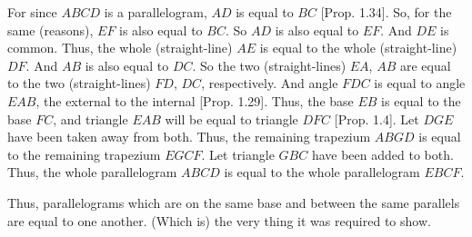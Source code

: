 \begin{Parallel}{}{}
{For since $ABCD$ is a parallelogram, $AD$ is equal to $BC$ [Prop. 1.34].
So, for the same (reasons), $EF$ is also equal to $BC$. So $AD$ is also equal to
$EF$. And $DE$ is common. Thus, the whole (straight-line) $AE$ is equal
to the whole (straight-line) $DF$.  And $AB$ is also equal to $DC$.
So the two (straight-lines) $EA$, $AB$
are equal to the two (straight-lines) $FD$, $DC$, respectively. And angle $FDC$ is
equal to angle $EAB$, the external to the internal [Prop. 1.29]. Thus, the
base $EB$ is equal to the base $FC$, and triangle $EAB$ will be equal to triangle
$DFC$ [Prop. 1.4]. Let $DGE$ have been taken away from both. 
Thus, the remaining trapezium $ABGD$ is equal to the remaining trapezium
$EGCF$. Let triangle $GBC$ have been added to both. Thus, the whole
parallelogram $ABCD$ is equal to the whole parallelogram $EBCF$.

Thus, parallelograms which are on the same base and between the same
parallels are equal to one another. (Which is) the very thing it was required to
show.}
\end{Parallel}


\vspace{7pt}{\footnotesize \noindent$^\dag$ Here, for the first time, ``equal'' means
``equal in area'', rather than ``congruent''.}

